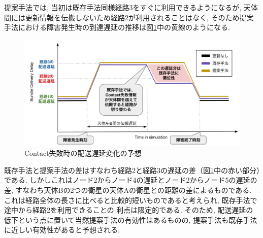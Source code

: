 提案手法では, 当初は既存手法同様経路3をすぐに利用できるようになるが, 
天体間には更新情報を伝搬しないため経路2が利用されることはなく, 
そのため提案手法における障害発生時の到達遅延の推移は図\ref{fig:example_of_delaychange}中の黄線のようになる. 

\begin{figure}[tbh]
    \centering
    \includegraphics[width=0.7\textheight]{img/example_of_delaychange.pdf}
    \caption{Contact失敗時の配送遅延変化の予想}
    \label{fig:example_of_delaychange}
\end{figure}

既存手法と提案手法の差はすなわち経路2と経路3の遅延の差（図\ref{fig:example_of_delaychange}中の赤い部分）である.
しかしこれはノード2からノード4の遅延とノード2からノード5の遅延の差, 
すなわち天体Bの2つの衛星の天体Aの衛星との距離の差によるものである. 
これは経路全体の長さに比べると比較的短いものであると考えられ, 既存手法で途中から経路2を利用できることの
利点は限定的である. そのため, 配送遅延の低下という点に置いて当然提案手法の有効性はあるものの, 
提案手法も既存手法に近しい有効性があると予想される.  
  